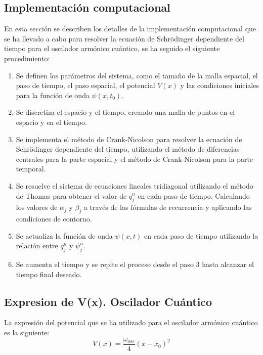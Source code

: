 \documentclass[10pt,onecolumn]{article}
\begin{document}
\subsection{Implementación computacional}
En esta sección se describen los detalles de la implementación computacional que se ha llevado a cabo para resolver la ecuación de Schrödinger dependiente del tiempo para el oscilador armónico cuántico, se ha seguido el siguiente procedimiento:

\begin{enumerate}
    \item Se definen los parámetros del sistema, como el tamaño de la malla espacial, el paso de tiempo, el paso espacial, el potencial $V(x)$ y las condiciones iniciales para la función de onda $\psi(x,t_0)$.
    \item Se discretiza el espacio y el tiempo, creando una malla de puntos en el espacio y en el tiempo.
    \item Se implementa el método de Crank-Nicolson para resolver la ecuación de Schrödinger dependiente del tiempo, utilizando el método de diferencias centrales para la parte espacial y el método de Crank-Nicolson para la parte temporal.
    \item Se resuelve el sistema de ecuaciones lineales tridiagonal utilizando el método de Thomas para obtener el valor de $q^n_j$ en cada paso de tiempo. Calculando los valores de $\alpha_j$ y $\beta_j$ a través de las fórmulas de recurrencia y aplicando las condiciones de contorno.
    \item Se actualiza la función de onda $\psi(x,t)$ en cada paso de tiempo utilizando la relación entre $q^n_j$ y $\psi^n_j$.
    \item Se aumenta el tiempo y se repite el proceso desde el paso 3 hasta alcanzar el tiempo final deseado.
\end{enumerate}


\subsection{Expresion de V(x). Oscilador Cuántico}
La expresión del potencial que se ha utilizado para el oscilador armónico cuántico es la siguiente:
\begin{equation}\label{eq:Vx}
    V(x) = \dfrac{\omega_{osc}}{4} (x-x_0)^2
\end{equation}
\end{document}
